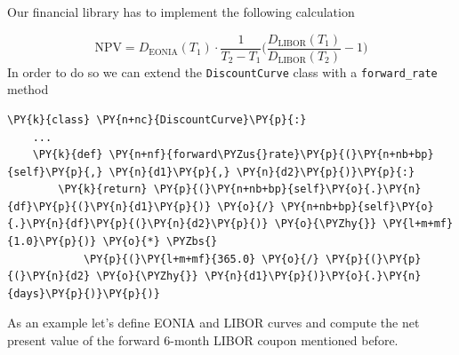 Our financial library has to implement the following calculation

\[\mathrm{NPV} = D_{\mathrm{EONIA}}(T_1) \cdot \frac{1}{T_2-T_1}\Big(\frac{D_{\mathrm{LIBOR}}(T_1)}{D_{\mathrm{LIBOR}}(T_2)} - 1 \Big)\]
\noindent
In order to do so we can extend the \texttt{DiscountCurve} class with a \texttt{forward\_rate}
method

\begin{codebox}
\begin{Verbatim}[commandchars=\\\{\}]
\PY{k}{class} \PY{n+nc}{DiscountCurve}\PY{p}{:}	
    ...
    \PY{k}{def} \PY{n+nf}{forward\PYZus{}rate}\PY{p}{(}\PY{n+nb+bp}{self}\PY{p}{,} \PY{n}{d1}\PY{p}{,} \PY{n}{d2}\PY{p}{)}\PY{p}{:}
        \PY{k}{return} \PY{p}{(}\PY{n+nb+bp}{self}\PY{o}{.}\PY{n}{df}\PY{p}{(}\PY{n}{d1}\PY{p}{)} \PY{o}{/} \PY{n+nb+bp}{self}\PY{o}{.}\PY{n}{df}\PY{p}{(}\PY{n}{d2}\PY{p}{)} \PY{o}{\PYZhy{}} \PY{l+m+mf}{1.0}\PY{p}{)} \PY{o}{*} \PYZbs{}
	        \PY{p}{(}\PY{l+m+mf}{365.0} \PY{o}{/} \PY{p}{(}\PY{p}{(}\PY{n}{d2} \PY{o}{\PYZhy{}} \PY{n}{d1}\PY{p}{)}\PY{o}{.}\PY{n}{days}\PY{p}{)}\PY{p}{)}
\end{Verbatim}
\end{codebox}

As an example let's define EONIA and LIBOR curves and compute the net present value 
of the forward 6-month LIBOR coupon mentioned before.

